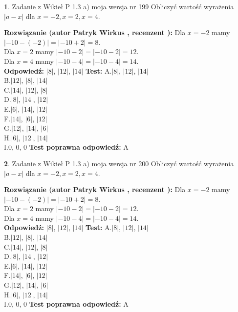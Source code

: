 \documentclass[12pt, a4paper]{article}
\theoremstyle{definition} %
\newtheorem{zad}{}
\newcommand{\zadStart}[1]{\begin{zad}#1\newline}
\newcommand{\zadStop}{\end{zad}}
\newcommand{\rozwStart}[2]{\noindent \textbf{Rozwiązanie (autor #1 , recenzent #2): }\newline}
\newcommand{\rozwStop}{\newline}
\newcommand{\odpStart}{\noindent \textbf{Odpowiedź:}\newline}
\newcommand{\odpStop}{\newline}
\newcommand{\testStart}{\noindent \textbf{Test:}\newline}
\newcommand{\testStop}{\newline}
\newcommand{\kluczStart}{\noindent \textbf{Test poprawna odpowiedź:}\newline}
\newcommand{\kluczStop}{\newline}
\begin{document}
\zadStart{Zadanie z Wikieł P 1.3 a) moja wersja nr 199}
Obliczyć wartość wyrażenia $|a - x|$ dla $x=-2,x=2,x=4$.
\zadStop
\rozwStart{Patryk Wirkus}{}
Dla $x = -2$ mamy $|-10 - (-2)| = |-10 + 2| = 8$.\\
Dla $x = 2$ mamy $|-10 - 2| = |-10 - 2| = 12$.\\
Dla $x = 4$ mamy $|-10 - 4| = |-10 - 4| = 14$.\\
\rozwStop
\odpStart
$|8|$, $|12|$, $|14|$
\odpStop
\testStart
A.$|8|$, $|12|$, $|14|$\\
B.$|12|$, $|8|$, $|14|$\\
C.$|14|$, $|12|$, $|8|$\\
D.$|8|$, $|14|$, $|12|$\\
E.$|6|$, $|14|$, $|12|$\\
F.$|14|$, $|6|$, $|12|$\\
G.$|12|$, $|14|$, $|6|$\\
H.$|6|$, $|12|$, $|14|$\\
I.$0$, $0$, $0$
\testStop
\kluczStart
A
\kluczStop



\zadStart{Zadanie z Wikieł P 1.3 a) moja wersja nr 200}
Obliczyć wartość wyrażenia $|a - x|$ dla $x=-2,x=2,x=4$.
\zadStop
\rozwStart{Patryk Wirkus}{}
Dla $x = -2$ mamy $|-10 - (-2)| = |-10 + 2| = 8$.\\
Dla $x = 2$ mamy $|-10 - 2| = |-10 - 2| = 12$.\\
Dla $x = 4$ mamy $|-10 - 4| = |-10 - 4| = 14$.\\
\rozwStop
\odpStart
$|8|$, $|12|$, $|14|$
\odpStop
\testStart
A.$|8|$, $|12|$, $|14|$\\
B.$|12|$, $|8|$, $|14|$\\
C.$|14|$, $|12|$, $|8|$\\
D.$|8|$, $|14|$, $|12|$\\
E.$|6|$, $|14|$, $|12|$\\
F.$|14|$, $|6|$, $|12|$\\
G.$|12|$, $|14|$, $|6|$\\
H.$|6|$, $|12|$, $|14|$\\
I.$0$, $0$, $0$
\testStop
\kluczStart
A
\kluczStop
\end{document}
